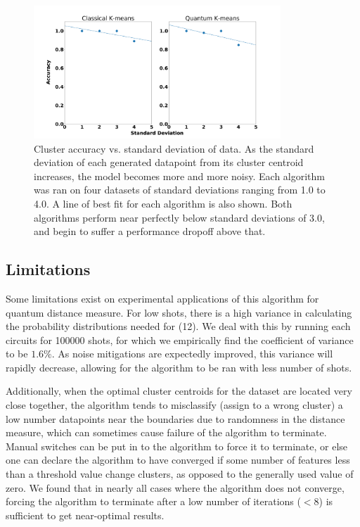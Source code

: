 \documentclass[twocolumn, english]{revtex4-2}
\begin{document}
\begin{figure}
\includegraphics[height=5cm, width=9.3cm]{Figure_noise_plot}
\caption{Cluster accuracy vs. standard deviation of data. As the standard deviation of each generated datapoint from its cluster centroid increases, the model becomes more and more noisy. Each algorithm was ran on four datasets of standard deviations ranging from 1.0 to 4.0. A line of best fit for each algorithm is also shown. Both algorithms perform near perfectly below standard deviations of 3.0, and begin to suffer a performance dropoff above that.}
\end{figure}

\subsection{Limitations}
Some limitations exist on experimental applications of this algorithm for quantum distance measure. For low shots, there is a high variance in calculating the probability distributions needed for (12). We deal with this by running each circuits for 100000 shots, for which we empirically find the coefficient of variance to be $1.6\%$. As noise mitigations are expectedly improved, this variance will rapidly decrease, allowing for the algorithm to be ran with less number of shots. 

Additionally, when the optimal cluster centroids for the dataset are located very close together, the algorithm tends to misclassify (assign to a wrong cluster) a low number datapoints near the boundaries due to randomness in the distance measure, which can sometimes cause failure of the algorithm to terminate. Manual switches can be put in to the algorithm to force it to terminate, or else one can declare the algorithm to have converged if some number of features less than a threshold value change clusters, as opposed to the generally used value of zero. We found that in nearly all cases where the algorithm does not converge, forcing the algorithm to terminate after a low number of iterations ($<8$) is sufficient to get near-optimal results.
\end{document}
